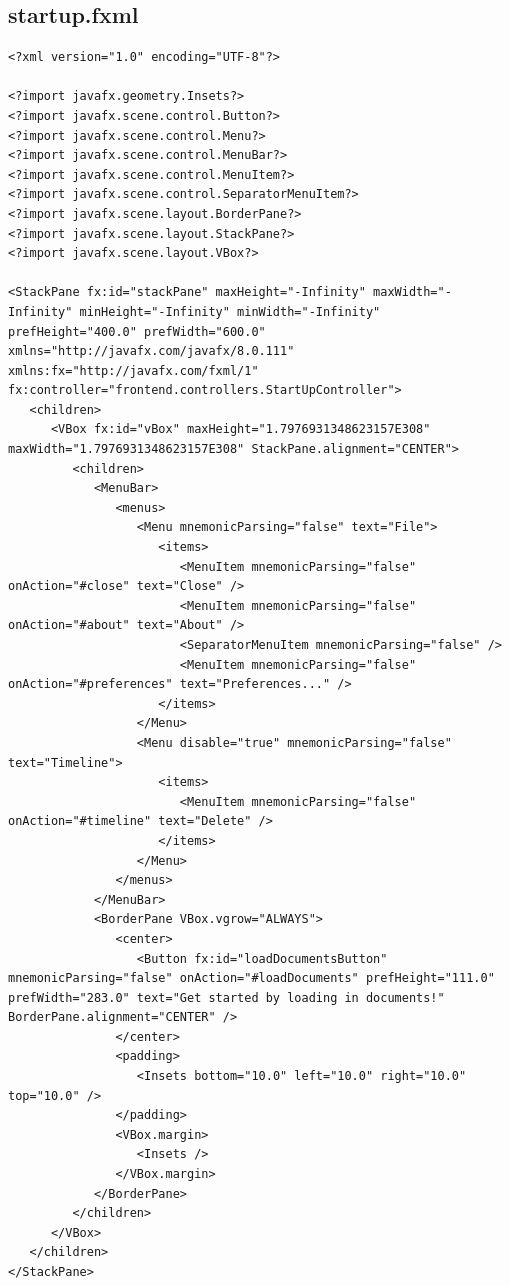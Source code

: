 \subsection{startup.fxml}
\begin{lstlisting}
<?xml version="1.0" encoding="UTF-8"?>

<?import javafx.geometry.Insets?>
<?import javafx.scene.control.Button?>
<?import javafx.scene.control.Menu?>
<?import javafx.scene.control.MenuBar?>
<?import javafx.scene.control.MenuItem?>
<?import javafx.scene.control.SeparatorMenuItem?>
<?import javafx.scene.layout.BorderPane?>
<?import javafx.scene.layout.StackPane?>
<?import javafx.scene.layout.VBox?>

<StackPane fx:id="stackPane" maxHeight="-Infinity" maxWidth="-Infinity" minHeight="-Infinity" minWidth="-Infinity" prefHeight="400.0" prefWidth="600.0" xmlns="http://javafx.com/javafx/8.0.111" xmlns:fx="http://javafx.com/fxml/1" fx:controller="frontend.controllers.StartUpController">
   <children>
      <VBox fx:id="vBox" maxHeight="1.7976931348623157E308" maxWidth="1.7976931348623157E308" StackPane.alignment="CENTER">
         <children>
            <MenuBar>
               <menus>
                  <Menu mnemonicParsing="false" text="File">
                     <items>
                        <MenuItem mnemonicParsing="false" onAction="#close" text="Close" />
                        <MenuItem mnemonicParsing="false" onAction="#about" text="About" />
                        <SeparatorMenuItem mnemonicParsing="false" />
                        <MenuItem mnemonicParsing="false" onAction="#preferences" text="Preferences..." />
                     </items>
                  </Menu>
                  <Menu disable="true" mnemonicParsing="false" text="Timeline">
                     <items>
                        <MenuItem mnemonicParsing="false" onAction="#timeline" text="Delete" />
                     </items>
                  </Menu>
               </menus>
            </MenuBar>
            <BorderPane VBox.vgrow="ALWAYS">
               <center>
                  <Button fx:id="loadDocumentsButton" mnemonicParsing="false" onAction="#loadDocuments" prefHeight="111.0" prefWidth="283.0" text="Get started by loading in documents!" BorderPane.alignment="CENTER" />
               </center>
               <padding>
                  <Insets bottom="10.0" left="10.0" right="10.0" top="10.0" />
               </padding>
               <VBox.margin>
                  <Insets />
               </VBox.margin>
            </BorderPane>
         </children>
      </VBox>
   </children>
</StackPane>
\end{lstlisting}


